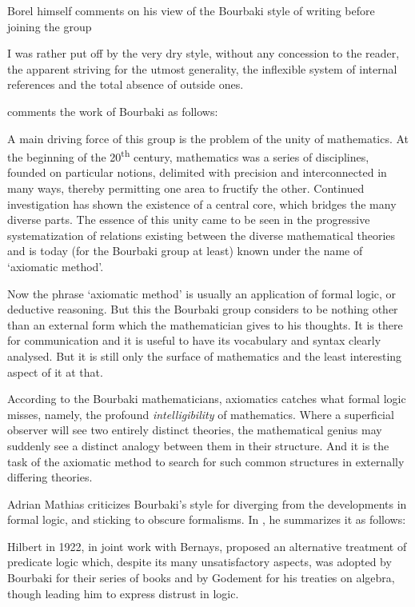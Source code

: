 \begin{remark}
  Borel himself comments on his view of the Bourbaki style of writing before joining the group
  \begin{displayquote}
    I was rather put off by the very dry style, without any concession to the reader, the apparent striving for the utmost generality, the inflexible system of internal references and the total absence of outside ones.
  \end{displayquote}

   comments the work of Bourbaki as follows:
  \begin{displayquote}
    A main driving force of this group is the problem of the unity of mathematics. At the beginning of the 20\textsuperscript{th} century, mathematics was a series of disciplines, founded on particular notions, delimited with precision and interconnected in many ways, thereby permitting one area to fructify the other. Continued investigation has shown the existence of a central core, which bridges the many diverse parts. The essence of this unity came to be seen in the progressive systematization of relations existing between the diverse mathematical theories and is today (for the Bourbaki group at least) known under the name of \enquote*{axiomatic method}.

    Now the phrase \enquote*{axiomatic method} is usually an application of formal logic, or deductive reasoning. But this the Bourbaki group considers to be nothing other than an external form which the mathematician gives to his thoughts. It is there for communication and it is useful to have its vocabulary and syntax clearly analysed. But it is still only the surface of mathematics and the least interesting aspect of it at that.

    According to the Bourbaki mathematicians, axiomatics catches what formal logic misses, namely, the profound \textit{intelligibility} of mathematics. Where a superficial observer will see two entirely distinct theories, the mathematical genius may suddenly see a distinct analogy between them in their structure. And it is the task of the axiomatic method to search for such common structures in externally differing theories.
  \end{displayquote}

  Adrian Mathias criticizes Bourbaki's style for diverging from the developments in formal logic, and sticking to obscure formalisms. In \cite[48]{Mathias2013BourbakiCriticism}, he summarizes it as follows:
  \begin{displayquote}
    Hilbert in 1922, in joint work with Bernays, proposed an alternative treatment of predicate logic which, despite its many unsatisfactory aspects, was adopted by Bourbaki for their series of books and by Godement for his treaties on algebra, though leading him to express distrust in logic.


\end{displayquote}
\end{remark}
